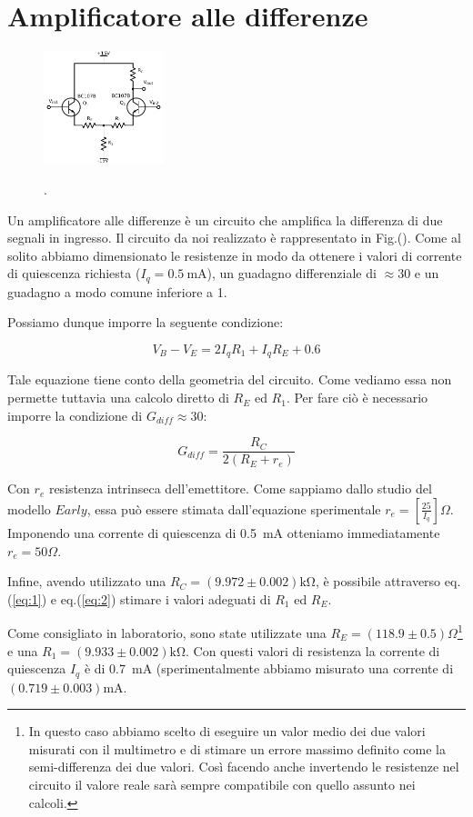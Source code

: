 \section{Amplificatore alle differenze}
\begin{figure}
	\caption{.}
	\includegraphics[width=35mm]{cc1.pdf}
	\label{fig:cc1}
\end{figure}

Un amplificatore alle differenze è un circuito che amplifica la differenza di due segnali in ingresso. 
Il circuito da noi realizzato è rappresentato in Fig.().
Come al solito abbiamo dimensionato le resistenze in modo da ottenere i valori di corrente di quiescenza richiesta ($I_q=\SI{0.5}{\milli\ampere}$), un guadagno differenziale di $\approx 30$ e un guadagno a modo comune inferiore a 1.

Possiamo dunque imporre la seguente condizione:

\begin{equation}
V_B-V_E=2I_q R_1 + I_q R_E + 0.6
\label{eq:1}
\end{equation}

Tale equazione tiene conto della geometria del circuito. Come vediamo essa non permette tuttavia una calcolo diretto di $R_E$ ed $R_1$. Per fare ciò è necessario imporre la condizione di $G_{diff} \approx 30$:

\begin{equation}
G_{diff}=\frac{R_C}{2(R_E+r_e)}
\label{eq:2}
\end{equation}

Con $r_e$ resistenza intrinseca dell'emettitore. Come sappiamo dallo studio del modello $Early$, essa può essere stimata dall'equazione sperimentale $r_e = [\frac{25}{I_q}] \Omega$. Imponendo una corrente di quiescenza di \SI{0.5}{\milli\ampere} otteniamo immediatamente $r_e=50 \Omega$. 

Infine, avendo utilizzato una $R_C=(9.972\pm0.002)\si{\kilo\ohm}$, è possibile attraverso eq.(\ref{eq:1}) e eq.(\ref{eq:2}) stimare i valori adeguati di $R_1$ ed $R_E$. 

Come consigliato in laboratorio, sono state utilizzate una $R_E=(118.9\pm0.5) \Omega$\footnote{In questo caso abbiamo scelto di eseguire un valor medio dei due valori misurati con il multimetro e di stimare un errore massimo definito come la semi-differenza dei due valori. Così facendo anche invertendo le resistenze nel circuito il valore reale sarà sempre compatibile con quello assunto nei calcoli.} e una $R_1= (9.933 \pm 0.002)\si{\kilo\ohm}$.
Con questi valori di resistenza la corrente di quiescenza $I_q$ è di \SI{0.7}{\milli\ampere} (sperimentalmente abbiamo misurato una corrente di $(0.719 \pm 0.003) \si{\milli\ampere}$.

